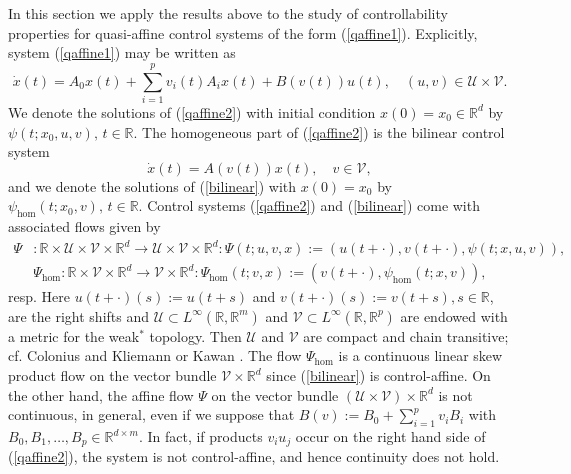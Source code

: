 \documentclass{siamltex}%
\begin{document}
In this section we apply the results above to the study of controllability
properties for quasi-affine control systems of the form (\ref{qaffine1}).
Explicitly, system (\ref{qaffine1}) may be written as%
\begin{equation}
\dot{x}(t)=A_{0}x(t)+\sum_{i=1}^{p}v_{i}(t)A_{i}x(t)+B(v(t))u(t),\quad
(u,v)\in\mathcal{U}\times\mathcal{V}. \label{qaffine2}%
\end{equation}
We denote the solutions of (\ref{qaffine2}) with initial condition
$x(0)=x_{0}\in\mathbb{R}^{d}$ by $\psi(t;x_{0},u,v),\allowbreak\,t\in
\mathbb{R}$. The homogeneous part of (\ref{qaffine2}) is the bilinear control
system
\begin{equation}
\dot{x}(t)=A(v(t))x(t),\quad v\in\mathcal{V}, \label{bilinear}%
\end{equation}
and we denote the solutions of (\ref{bilinear}) with $x(0)=x_{0}$ by
$\psi_{\hom}(t;x_{0},v),\,t\in\mathbb{R}$. Control systems (\ref{qaffine2})
and (\ref{bilinear}) come with associated flows given by
\begin{align*}
\Psi &  :\mathbb{R}\times\mathcal{U}\times\mathcal{V}\times\mathbb{R}%
^{d}\rightarrow\mathcal{U}\times\mathcal{V}\times\mathbb{R}^{d}:\Psi
(t;u,v,x):=(u(t+\cdot),v(t+\cdot),\psi(t;x,u,v)),\\
&  \left.  \Psi_{\hom}:\mathbb{R}\times\mathcal{V}\times\mathbb{R}%
^{d}\rightarrow\mathcal{V}\times\mathbb{R}^{d}:\Psi_{\hom}(t;v,x):=(v(t+\cdot
),\psi_{\hom}(t;x,v)),\right.
\end{align*}
resp. Here $u(t+\cdot)(s):=u(t+s)$ and $v(t+\cdot)(s):=v(t+s),s\in\mathbb{R}$,
are the right shifts and $\mathcal{U}\subset L^{\infty}(\mathbb{R}%
,\mathbb{R}^{m})$ and $\mathcal{V}\subset L^{\infty}(\mathbb{R},\mathbb{R}%
^{p})$ are endowed with a metric for the weak$^{\ast}$ topology. Then
$\mathcal{U}$ and $\mathcal{V}$ are compact and chain transitive; cf. Colonius
and Kliemann \cite[Chapter 4]{ColK00} or Kawan \cite[Section 1.4]{Kawa13}. The
flow $\Psi_{\hom}$ is a continuous linear skew product flow on the vector
bundle $\mathcal{V}\times\mathbb{R}^{d}$ since (\ref{bilinear}) is
control-affine. On the other hand, the affine flow $\Psi$ on the vector bundle
$(\mathcal{U}\times\mathcal{V})\times\mathbb{R}^{d}$ is not continuous, in
general, even if we suppose that $B(v):=B_{0}+\sum_{i=1}^{p}v_{i}B_{i}$ with
$B_{0},B_{1},\ldots,B_{p}\in\mathbb{R}^{d\times m}$. In fact, if products
$v_{i}u_{j}$ occur on the right hand side of (\ref{qaffine2}), the system is
not control-affine, and hence continuity does not hold.
\end{document}
